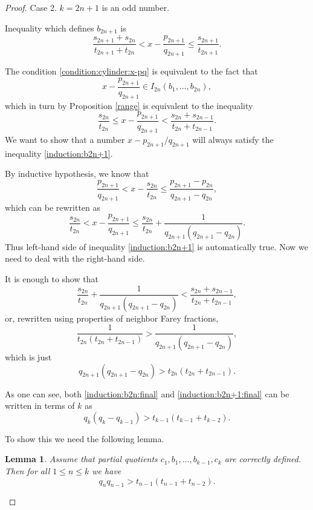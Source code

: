 \documentclass{amsart}
\newtheorem{lemma}[theorem]{Lemma}
\theoremstyle{definition}
\newcommand{\0}{\mbf 0}%
\begin{document}
\begin{proof}
Case 2.  $k=2n+1$ is an odd number. 

Inequality which defines $b_{2n+1}$ is 
\begin{equation}\label{deff:b2n+1}
\frac{s_{2n+1}+s_{2n}}{t_{2n+1}+t_{2n}} < x - \frac{p_{2n+1}}{q_{2n+1}} \leq    \frac{s_{2n+1}}{t_{2n+1}}.
\end{equation}

The condition \eqref{condition:cylinder:x-pq} is equivalent to the fact that 
$$
x-\frac{p_{2n+1}}{q_{2n+1}} \in I_{2n}(b_1,\ldots,b_{2n}),
$$
which in turn by Proposition \ref{range} is equivalent to the inequality
\begin{equation}\label{induction:b2n+1}
\frac{s_{2n}}{t_{2n}}   \leq x - \frac{p_{2n+1}}{q_{2n+1}} < \frac{s_{2n}+s_{2n-1}}{t_{2n}+t_{2n-1}}.
\end{equation}
We want to show that a number $x-p_{2n+1}/q_{2n+1}$ will always satisfy the inequality \eqref{induction:b2n+1}.

By inductive hypothesis, we know that
$$
\frac{p_{2n+1}}{q_{2n+1}}  < x - \frac{s_{2n}}{t_{2n}} \leq \frac{p_{2n+1}-p_{2n}}{q_{2n+1}-q_{2n}},
$$
which can be rewritten as 
$$
\frac{s_{2n}}{t_{2n}}  < x - \frac{p_{2n+1}}{q_{2n+1}} \leq \frac{s_{2n}}{t_{2n}}+ \frac{1}{q_{2n+1}(q_{2n+1}-q_{2n})}.
$$
Thus left-hand side of inequality \eqref{induction:b2n+1} is automatically true. Now we need to deal with the right-hand side.

It is enough to show that
$$
\frac{s_{2n}}{t_{2n}}+ \frac{1}{q_{2n+1}(q_{2n+1}-q_{2n})} < \frac{s_{2n}+s_{2n-1}}{t_{2n}+t_{2n-1}},
$$
or, rewritten using properties of neighbor Farey fractions,
\begin{equation}
\frac{1}{t_{2n}(t_{2n}+t_{2n-1})} > \frac{1}{q_{2n+1}(q_{2n+1}-q_{2n})},
\end{equation}
which is just
\begin{equation}\label{induction:b2n+1:final}
q_{2n+1}(q_{2n+1}-q_{2n}) >t_{2n}(t_{2n}+t_{2n-1}).
\end{equation}


As one can see, both \eqref{induction:b2n:final} and \eqref{induction:b2n+1:final} can be written in terms of $k$ as
\begin{equation}\label{induction:bnbn:finalefinale}
q_k(q_k-q_{k-1}) > t_{k-1}(t_{k-1}+t_{k-2}).
\end{equation}


To show this we need the following lemma.
 
\begin{lemma}\label{lemma:quotient:qlarge}
Assume that partial quotients $c_1,b_1,\ldots,b_{k-1},c_k$ are correctly defined. Then for all $1\leq n \leq k$ we have 
\begin{equation}\label{inequality:lemma1}
q_{n}q_{n-1} > t_{n-1}(t_{n-1}+t_{n-2}) .
\end{equation}
\end{lemma}


\end{proof}
\end{document}
